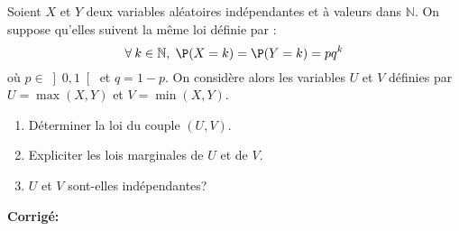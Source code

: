 \documentclass[a4paper,twoside,french,11pt]{VcCours}
\newcommand{\corr}{\textbf{Corrigé:}}
\begin{document}
\begin{Exercice}{} Soient $X$ et $Y$ deux variables aléatoires indépendantes et à valeurs dans $\mathbb{N}$. On suppose qu'elles suivent la même loi définie par :
$$\forall\:k\in\mathbb{N}, \; \P(X=k)=\P(Y=k)=pq^k$$
où $p \in \left] 0,1\right[$ et $q=1-p$. On considère alors les variables $U$ et $V$ définies par $U=\max(X,Y)$ et $V=\min(X,Y)$.
\begin{enumerate}
\item
Déterminer la loi du couple $(U,V)$.
\item
Expliciter les lois marginales de $U$ et de $V$.
\item
$U$ et $V$ sont-elles indépendantes?
\end{enumerate}
\end{Exercice}

\corr
\end{document}
